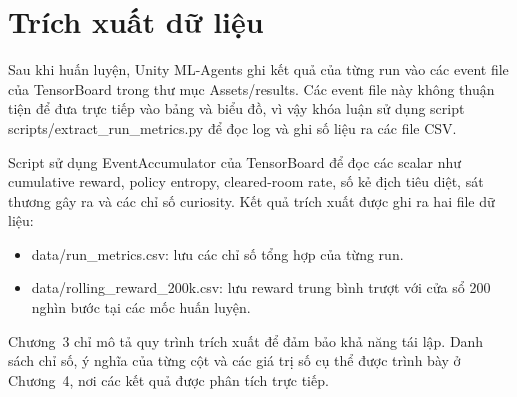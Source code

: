 \section{Trích xuất dữ liệu}

Sau khi huấn luyện, Unity ML-Agents ghi kết quả của từng run vào các event file của TensorBoard trong thư mục Assets/results. Các event file này không thuận tiện để đưa trực tiếp vào bảng và biểu đồ, vì vậy khóa luận sử dụng script scripts/extract\_run\_metrics.py để đọc log và ghi số liệu ra các file CSV.

Script sử dụng EventAccumulator của TensorBoard để đọc các scalar như cumulative reward, policy entropy, cleared-room rate, số kẻ địch tiêu diệt, sát thương gây ra và các chỉ số curiosity. Kết quả trích xuất được ghi ra hai file dữ liệu:

\begin{itemize}
    \item data/run\_metrics.csv: lưu các chỉ số tổng hợp của từng run.
    \item data/rolling\_reward\_200k.csv: lưu reward trung bình trượt với cửa sổ 200 nghìn bước tại các mốc huấn luyện.
\end{itemize}

Chương~3 chỉ mô tả quy trình trích xuất để đảm bảo khả năng tái lập. Danh sách chỉ số, ý nghĩa của từng cột và các giá trị số cụ thể được trình bày ở Chương~4, nơi các kết quả được phân tích trực tiếp.
